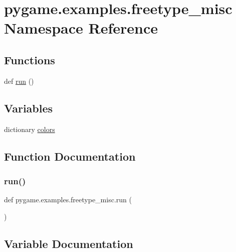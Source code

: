 \hypertarget{namespacepygame_1_1examples_1_1freetype__misc}{}\section{pygame.\+examples.\+freetype\+\_\+misc Namespace Reference}
\label{namespacepygame_1_1examples_1_1freetype__misc}
\subsection*{Functions}
\begin{DoxyCompactItemize}
\item 
def \hyperlink{namespacepygame_1_1examples_1_1freetype__misc_acc25134c5dec04aca7a9833e70f85e07}{run} ()
\end{DoxyCompactItemize}
\subsection*{Variables}
\begin{DoxyCompactItemize}
\item 
dictionary \hyperlink{namespacepygame_1_1examples_1_1freetype__misc_a40443fb0a279d87baad384879678f785}{colors}
\end{DoxyCompactItemize}


\subsection{Function Documentation}
\mbox{\label{namespacepygame_1_1examples_1_1freetype__misc_acc25134c5dec04aca7a9833e70f85e07}} 
\subsubsection{\texorpdfstring{run()}{run()}}
{\footnotesize\ttfamily def pygame.\+examples.\+freetype\+\_\+misc.\+run (\begin{DoxyParamCaption}{ }\end{DoxyParamCaption})}



\subsection{Variable Documentation}
\mbox{\label{namespacepygame_1_1examples_1_1freetype__misc_a40443fb0a279d87baad384879678f785}} 
